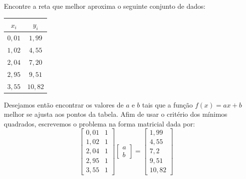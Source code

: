 \begin{ex} Encontre a reta que melhor aproxima o seguinte conjunto de dados:
  \begin{center}
    \begin{tabular}{|c|c|}
      \hline
      $x_i$ & $y_i$\\
      \hline
      $0,01$ & $1,99$\\
      $1,02$ & $4,55$\\
      $2,04$ & $7,20$\\
      $2,95$ & $9,51$\\
      $3,55$ & $10,82$\\
      \hline
    \end{tabular}
  \end{center}
\end{ex}
\begin{sol}
Desejamos então encontrar os valores de $a$ e $b$ tais que a função $f(x)=ax+b$ melhor se ajusta aos pontos da tabela. Afim de usar  o critério dos mínimos quadrados, escrevemos o problema na forma matricial dada por:
$$
\left[\begin{array}{cc}
0,01 &1\\
1,02 &1\\
2,04 &1\\
2,95 &1\\
3,55 &1
\end{array}
\right]
\left[\begin{array}{c}
a\\
b
\end{array}
\right]
=
\left[\begin{array}{c}
1,99\\
4,55\\
7,2\\
9,51\\
10,82
\end{array}
\right]
$$


\end{sol}
